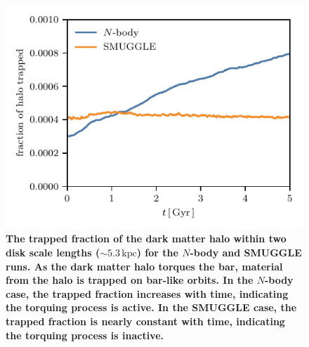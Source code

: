 \documentclass[twocolumn,linenumbers,trackchanges]{aastex631}
\newcommand{\Nbody}{$N$-body}
\newcommand{\SMUGGLE}{SMUGGLE}
\begin{document}
\begin{figure}
    \centering
    \includegraphics[width=\columnwidth]{fig/halo_trapped.pdf}
    \caption{{\bf The trapped fraction of the dark matter halo within two disk scale
    lengths ($\sim5.3\,\textrm{kpc}$) for the \Nbody{} and \SMUGGLE{} runs. As
    the dark matter halo torques the bar, material from the halo is trapped on
    bar-like orbits. In the \Nbody{} case, the trapped fraction increases with
    time, indicating the torquing process is active. In the \SMUGGLE{} case, the
    trapped fraction is nearly constant with time, indicating the torquing
    process is inactive.}}
    \label{fig:htrap}
\end{figure}
\end{document}
